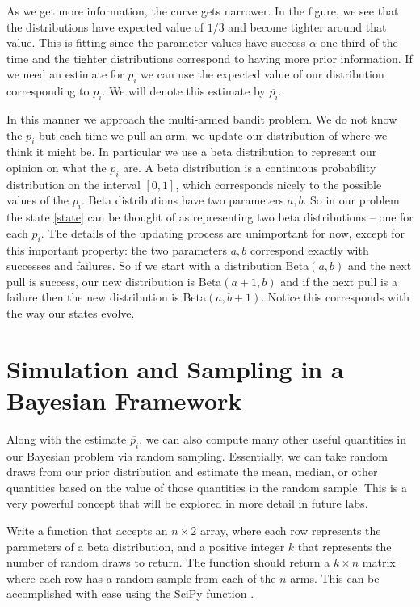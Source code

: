 As we get more information, the curve gets narrower.  
In the figure, we see that the distributions have expected 
value of $1/3$ and become tighter around that value.  
This is fitting since the parameter values have success $\alpha$ one 
third of the time and the tighter distributions correspond to having 
more prior information.  If we need an estimate for $p_i$ we can use 
the expected value of our distribution corresponding to $p_i$.  
We will denote this estimate by $\overline{p_i}$.

In this manner we approach the multi-armed bandit problem.  
We do not know the $p_i$ but each time we pull an arm, we update our distribution of where we think it might be.  
In particular we use a beta distribution to represent our opinion on what the $p_i$ are.  
A beta distribution is a continuous probability distribution on the interval $[0,1]$, 
which corresponds nicely to the possible values of the $p_i$.  Beta distributions have two parameters $a,b$.  
So in our problem the state \eqref{state} can be thought of as representing two beta distributions -- one for each $p_i$. 
The details of the updating process are unimportant for now, except 
for this important property: the two parameters $a,b$ correspond exactly with successes and failures.  
So if we start with a distribution Beta$(a,b)$ and the next pull is success, our new distribution is 
Beta$(a+1,b)$ and if the next pull is a failure then the new distribution is Beta$(a,b+1)$.  
Notice this corresponds with the way our states evolve.

\section*{Simulation and Sampling in a Bayesian Framework}
Along with the estimate $\overline{p_i}$, we can also compute many other useful 
quantities in our Bayesian problem via random sampling.  Essentially, we can take 
random draws from our prior distribution and estimate the mean, median, or other 
quantities based on the value of those quantities in the random sample.  
This is a very powerful concept that will be explored in more detail in future labs.

\begin{problem}
Write a function  that accepts an $n\times 2$ array, where each 
row represents the parameters of a beta distribution, and a positive integer $k$ 
that represents the number of random draws to return.  
The function should return a $k\times n$ matrix where each row has a random sample
from each of the $n$ arms.  This can be accomplished with ease using the SciPy function
.
\label{prob:simdata}
\end{problem}

